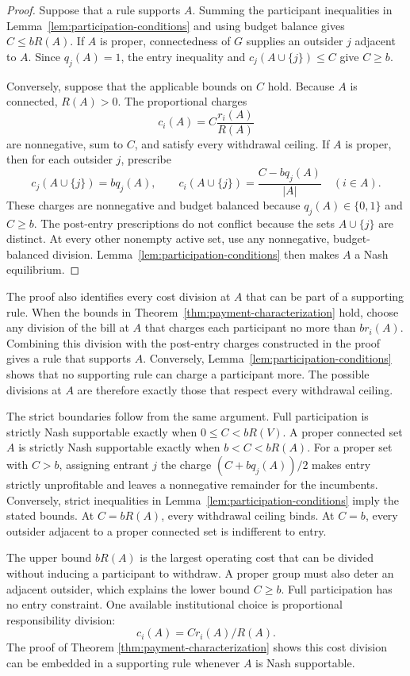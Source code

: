 \documentclass[preprint,12pt,authoryear]{elsarticle}
\begin{document}
\begin{proof}
Suppose that a rule supports \(A\). Summing the participant inequalities in
Lemma~\ref{lem:participation-conditions} and using budget balance gives
\(C\leq bR(A)\). If \(A\) is proper, connectedness of \(G\) supplies an
outsider \(j\) adjacent to \(A\). Since \(q_j(A)=1\), the entry inequality and
\(c_j(A\cup\{j\})\leq C\) give \(C\geq b\).

Conversely, suppose that the applicable bounds on \(C\) hold. Because \(A\) is
connected, \(R(A)>0\). The proportional charges
\[
 c_i(A)=C\frac{r_i(A)}{R(A)}
\]
are nonnegative, sum to \(C\), and satisfy every withdrawal ceiling. If \(A\)
is proper, then for each outsider \(j\), prescribe
\[
 c_j(A\cup\{j\})=bq_j(A),
 \qquad
 c_i(A\cup\{j\})=\frac{C-bq_j(A)}{|A|}
 \quad(i\in A).
\]
These charges are nonnegative and budget balanced because
\(q_j(A)\in\{0,1\}\) and \(C\geq b\). The post-entry prescriptions do not
conflict because the sets
\(A\cup\{j\}\) are distinct. At every other nonempty active set, use any
nonnegative, budget-balanced division. Lemma~\ref{lem:participation-conditions}
then makes \(A\) a Nash equilibrium.

\end{proof}

The proof also identifies every cost division at \(A\) that can be part of a
supporting rule. When the bounds in
Theorem~\ref{thm:payment-characterization} hold, choose any division of the bill
at \(A\) that charges each participant no more than \(br_i(A)\). Combining this
division with the post-entry charges constructed in the proof gives a rule that
supports \(A\). Conversely, Lemma~\ref{lem:participation-conditions} shows that
no supporting rule can charge a participant more. The possible divisions at
\(A\) are therefore exactly those that respect every withdrawal ceiling.

The strict boundaries follow from the same argument. Full participation is
strictly Nash supportable exactly when
\(0\leq C<bR(V)\). A proper connected set $A$ is strictly Nash supportable exactly
when \(b<C<bR(A)\). For a proper set with \(C>b\), assigning entrant
\(j\) the charge \((C+bq_j(A))/2\) makes entry strictly unprofitable and leaves
a nonnegative remainder for the incumbents. Conversely, strict inequalities in
Lemma~\ref{lem:participation-conditions} imply the stated bounds. At
\(C=bR(A)\), every withdrawal ceiling binds. At \(C=b\), every outsider adjacent
to a proper connected set is indifferent to entry.

The upper bound \(bR(A)\) is the largest operating cost that can be divided
without inducing a participant to withdraw. A proper group must also deter an
adjacent outsider, which explains the lower bound \(C\geq b\). Full
participation has no entry constraint. One available institutional choice is
proportional responsibility division:
\begin{equation}
  c_i(A) = C r_i(A) / R(A).
  \label{eq:proportional-responsibility}
\end{equation}
The proof of Theorem \ref{thm:payment-characterization} shows this cost division can be embedded in a supporting rule whenever \(A\) is Nash supportable.
\end{document}
